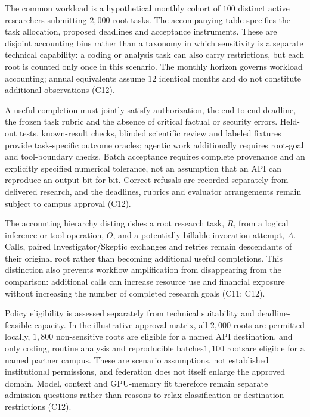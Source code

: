 \documentclass[11pt]{article}
\begin{document}
The common workload is a hypothetical monthly cohort of $100$ distinct active researchers submitting $2{,}000$ root tasks. The accompanying table specifies the task allocation, proposed deadlines and acceptance instruments. These are disjoint accounting bins rather than a taxonomy in which sensitivity is a separate technical capability: a coding or analysis task can also carry restrictions, but each root is counted only once in this scenario. The monthly horizon governs workload accounting; annual equivalents assume $12$ identical months and do not constitute additional observations (C12).

A useful completion must jointly satisfy authorization, the end-to-end deadline, the frozen task rubric and the absence of critical factual or security errors. Held-out tests, known-result checks, blinded scientific review and labeled fixtures provide task-specific outcome oracles; agentic work additionally requires root-goal and tool-boundary checks. Batch acceptance requires complete provenance and an explicitly specified numerical tolerance, not an assumption that an API can reproduce an output bit for bit. Correct refusals are recorded separately from delivered research, and the deadlines, rubrics and evaluator arrangements remain subject to campus approval (C12).

The accounting hierarchy distinguishes a root research task, $R$, from a logical inference or tool operation, $O$, and a potentially billable invocation attempt, $A$. Calls, paired Investigator/Skeptic exchanges and retries remain descendants of their original root rather than becoming additional useful completions. This distinction also prevents workflow amplification from disappearing from the comparison: additional calls can increase resource use and financial exposure without increasing the number of completed research goals (C11; C12).

Policy eligibility is assessed separately from technical suitability and deadline-feasible capacity. In the illustrative approval matrix, all $2{,}000$ roots are permitted locally, $1{,}800$ non-sensitive roots are eligible for a named API destination, and only coding, routine analysis and reproducible batches\textemdash{}$1{,}100$ roots\textemdash{}are eligible for a named partner campus. These are scenario assumptions, not established institutional permissions, and federation does not itself enlarge the approved domain. Model, context and GPU-memory fit therefore remain separate admission questions rather than reasons to relax classification or destination restrictions (C12).
\end{document}
